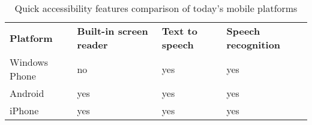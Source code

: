 \begin{table}[htbp]
  \centering
  \caption{Quick accessibility features comparison of today's mobile platforms}
  \label{tab:accbilityComparison}
 \renewcommand{\arraystretch}{1.2}
    \begin{tabularx}{\textwidth}{p{2.5cm}|X|X|X}
    \rowcolor{mygray}
    \textbf{Platform} & \textbf{Built-in screen reader} & \textbf{Text to speech} & \textbf{Speech recognition} \\
    Windows Phone & no & yes & yes \\ \hline
    Android & yes & yes & yes \\ \hline
    iPhone & yes & yes & yes \\
    \end{tabularx}%
\end{table}%

